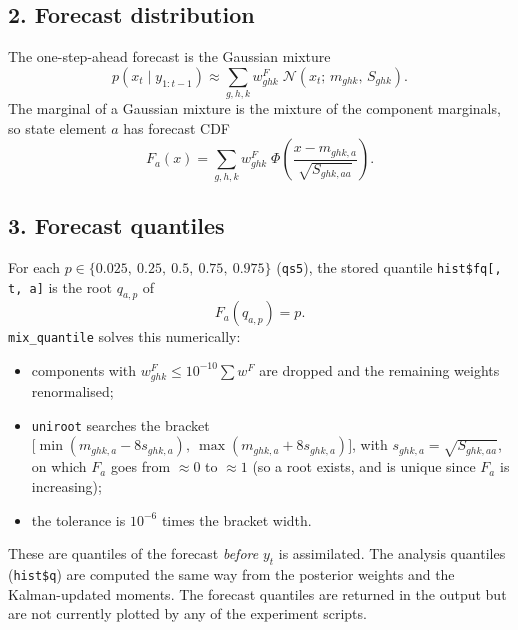 \documentclass[11pt]{article}
\begin{document}
\subsection*{2. Forecast distribution}
The one-step-ahead forecast is the Gaussian mixture
\[
  p(x_t \mid y_{1:t-1}) \approx \sum_{g,h,k} w^F_{ghk}\; \mathcal{N}\!\left(x_t;\, m_{ghk},\, S_{ghk}\right).
\]
The marginal of a Gaussian mixture is the mixture of the component marginals, so state
element $a$ has forecast CDF
\[
  F_a(x) = \sum_{g,h,k} w^F_{ghk}\; \Phi\!\left( \frac{x - m_{ghk,a}}{\sqrt{S_{ghk,aa}}} \right).
\]

\subsection*{3. Forecast quantiles}
For each $p \in \{0.025,\ 0.25,\ 0.5,\ 0.75,\ 0.975\}$ (\texttt{qs5}), the stored quantile
\texttt{hist\$fq[, t, a]} is the root $q_{a,p}$ of
\[
  F_a(q_{a,p}) = p .
\]
\texttt{mix\_quantile} solves this numerically:
\begin{itemize}
  \item components with $w^F_{ghk} \le 10^{-10} \sum w^F$ are dropped and the remaining weights renormalised;
  \item \texttt{uniroot} searches the bracket
    $\bigl[\min (m_{ghk,a} - 8 s_{ghk,a}),\ \max (m_{ghk,a} + 8 s_{ghk,a})\bigr]$, with $s_{ghk,a} = \sqrt{S_{ghk,aa}}$,
    on which $F_a$ goes from $\approx 0$ to $\approx 1$ (so a root exists, and is unique since $F_a$ is increasing);
  \item the tolerance is $10^{-6}$ times the bracket width.
\end{itemize}
These are quantiles of the forecast \emph{before} $y_t$ is assimilated. The analysis
quantiles (\texttt{hist\$q}) are computed the same way from the posterior weights and the
Kalman-updated moments. The forecast quantiles are returned in the output but are not
currently plotted by any of the experiment scripts.
\end{document}
